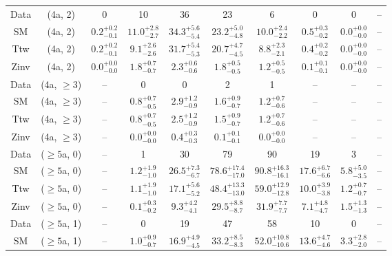 \begin{table}[h!]
{\begin{tabular}{cccccccccc}
	Data & (4a, 2) & 0 & 10 & 36 & 23 & 6 & 0 & 0 & -- \\[0.5ex] 
	SM & (4a, 2) & $0.2^{+ 0.2 }_{- 0.1 }$ & $11.0^{+ 2.8 }_{- 2.7 }$ & $34.3^{+ 5.6 }_{- 5.4 }$ & $23.2^{+ 5.0 }_{- 4.8 }$ & $10.0^{+ 2.4 }_{- 2.2 }$ & $0.5^{+ 0.3 }_{- 0.2 }$ & $0.0^{+ 0.0 }_{- 0.0 }$ & -- \\[0.5ex] 
	Ttw & (4a, 2) & $0.2^{+ 0.2 }_{- 0.1 }$ & $9.1^{+ 2.6 }_{- 2.6 }$ & $31.7^{+ 5.4 }_{- 5.3 }$ & $20.7^{+ 4.7 }_{- 4.5 }$ & $8.8^{+ 2.3 }_{- 2.1 }$ & $0.4^{+ 0.2 }_{- 0.2 }$ & $0.0^{+ 0.0 }_{- 0.0 }$ & -- \\[0.5ex] 
	Zinv & (4a, 2) & $0.0^{+ 0.0 }_{- 0.0 }$ & $1.8^{+ 0.7 }_{- 0.7 }$ & $2.3^{+ 0.6 }_{- 0.6 }$ & $1.8^{+ 0.5 }_{- 0.5 }$ & $1.2^{+ 0.5 }_{- 0.5 }$ & $0.1^{+ 0.1 }_{- 0.1 }$ & $0.0^{+ 0.0 }_{- 0.0 }$ & -- \\[0.5ex] 
	Data & (4a, $\ge3$) & -- & 0 & 0 & 2 & 1 & -- & -- & -- \\[0.5ex] 
	SM & (4a, $\ge3$) & -- & $0.8^{+ 0.7 }_{- 0.5 }$ & $2.9^{+ 1.2 }_{- 0.9 }$ & $1.6^{+ 0.9 }_{- 0.7 }$ & $1.2^{+ 0.7 }_{- 0.6 }$ & -- & -- & -- \\[0.5ex] 
	Ttw & (4a, $\ge3$) & -- & $0.8^{+ 0.7 }_{- 0.5 }$ & $2.5^{+ 1.2 }_{- 0.9 }$ & $1.5^{+ 0.9 }_{- 0.7 }$ & $1.2^{+ 0.7 }_{- 0.6 }$ & -- & -- & -- \\[0.5ex] 
	Zinv & (4a, $\ge3$) & -- & $0.0^{+ 0.0 }_{- 0.0 }$ & $0.4^{+ 0.3 }_{- 0.3 }$ & $0.1^{+ 0.1 }_{- 0.1 }$ & $0.0^{+ 0.0 }_{- 0.0 }$ & -- & -- & -- \\[0.5ex] 
	Data & ($\ge5$a, 0) & -- & 1 & 30 & 79 & 90 & 19 & 3 & -- \\[0.5ex] 
	SM & ($\ge5$a, 0) & -- & $1.2^{+ 1.9 }_{- 1.0 }$ & $26.5^{+ 7.3 }_{- 6.7 }$ & $78.6^{+ 17.4 }_{- 17.0 }$ & $90.8^{+ 16.3 }_{- 16.1 }$ & $17.6^{+ 6.7 }_{- 6.6 }$ & $5.8^{+ 5.0 }_{- 3.5 }$ & -- \\[0.5ex] 
	Ttw & ($\ge5$a, 0) & -- & $1.1^{+ 1.9 }_{- 1.0 }$ & $17.1^{+ 5.6 }_{- 5.2 }$ & $48.4^{+ 13.3 }_{- 13.0 }$ & $59.0^{+ 12.9 }_{- 12.8 }$ & $10.0^{+ 3.9 }_{- 3.8 }$ & $1.2^{+ 0.7 }_{- 0.7 }$ & -- \\[0.5ex] 
	Zinv & ($\ge5$a, 0) & -- & $0.1^{+ 0.3 }_{- 0.2 }$ & $9.3^{+ 4.2 }_{- 4.1 }$ & $29.5^{+ 8.8 }_{- 8.7 }$ & $31.9^{+ 7.7 }_{- 7.7 }$ & $7.1^{+ 4.8 }_{- 4.7 }$ & $1.5^{+ 1.3 }_{- 1.3 }$ & -- \\[0.5ex] 
	Data & ($\ge5$a, 1) & -- & 0 & 19 & 47 & 58 & 10 & 0 & -- \\[0.5ex] 
	SM & ($\ge5$a, 1) & -- & $1.0^{+ 0.9 }_{- 0.7 }$ & $16.9^{+ 4.9 }_{- 4.5 }$ & $33.2^{+ 8.5 }_{- 8.3 }$ & $52.0^{+ 10.8 }_{- 10.6 }$ & $13.6^{+ 4.7 }_{- 4.6 }$ & $3.3^{+ 2.8 }_{- 2.0 }$ & -- \\[0.5ex] 

\end{tabular}}
\end{table}
